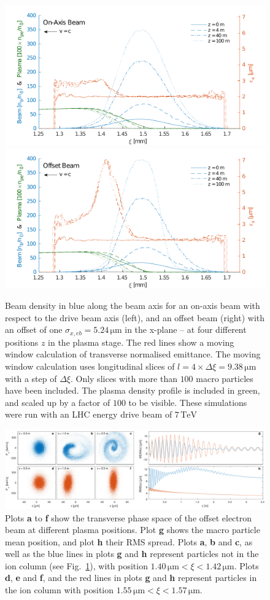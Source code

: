\documentclass[aps,prstab,reprint,amsmath,amssymb,groupedaddress]{revtex4-1}
\newcommand{\unit}[1]{\,\mathrm{#1}}
\begin{document}
\begin{figure}[hbt]
    \includegraphics[width=0.495\linewidth,trim={2mm 0mm 2mm 0mm},clip]{figures/beamEmittance}
    \includegraphics[width=0.495\linewidth,trim={2mm 0mm 2mm 0mm},clip]{figures/beamEmittanceOffset}
    \caption{\label{Fig:BeamEmitt} Beam density in blue along the beam axis for an on-axis beam with respect to the
        drive beam axis (left), and an offset beam (right) with an offset of one $\sigma_{x,eb} = 5.24\unit{\mu m}$ in
        the x-plane -- at four different positions $z$ in the plasma stage. The red lines show a moving window
        calculation of transverse normalised emittance. The moving window calculation uses longitudinal slices of
        $l = 4\times\Delta\xi = 9.38\unit{\mu m}$ with a step of $\Delta\xi$. Only slices with more than $100$ macro
        particles have been included. The plasma density profile is included in green, and scaled up by a factor of
        $100$ to be visible. These simulations were run with an LHC energy drive beam of $7\unit{TeV}$}
\end{figure}

\begin{figure}[hbt]
    \includegraphics[width=\linewidth,trim={0mm 0mm 0mm 0mm},clip]{figures/beamFilamentationAll}
    \caption{\label{Fig:BeamFilament} Plots \textbf{a} to \textbf{f} show the transverse phase space of the offset
        electron beam at different plasma positions. Plot \textbf{g} shows the macro particle mean position, and plot
        \textbf{h} their RMS spread. Plots \textbf{a}, \textbf{b} and \textbf{c}, as well as the blue lines in plots
        \textbf{g} and \textbf{h} represent particles not in the ion column (see Fig.~\ref{Fig:BeamEmitt}), with
        position $1.40\unit{\mu m} < \xi < 1.42\unit{\mu m}$. Plots \textbf{d}, \textbf{e} and \textbf{f}, and the red
        lines in plots \textbf{g} and \textbf{h} represent particles in the ion column with position
        $1.55\unit{\mu m} < \xi < 1.57\unit{\mu m}$.}
\end{figure}
\end{document}
